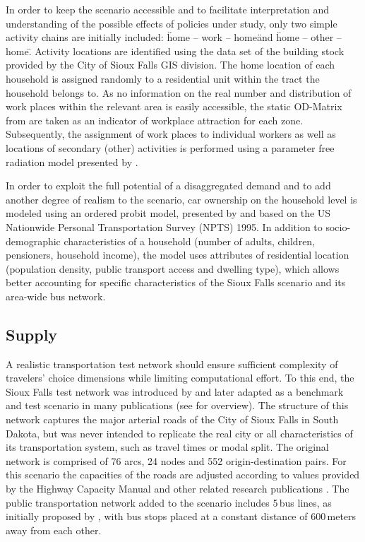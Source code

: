In order to keep the scenario accessible and to facilitate interpretation and understanding of the possible effects of policies under study, only two simple activity chains are initially included: \"home – work – home\" and \"home – other – home\". Activity locations are identified using the data set of the building stock provided by the City of Sioux Falls GIS division. The home location of each household is assigned randomly to a residential unit within the tract the household belongs to. As no information on the real number and distribution of work places within the relevant area is easily accessible, the static OD-Matrix from \citet[][]{LeBlancEtAl_TransRes_1975} are taken as an indicator of workplace attraction for each zone. Subsequently, the assignment of work places to individual workers as well as locations of secondary (other) activities is performed using a parameter free radiation model presented by \citet[][]{SiminiEtAl_NAT_2012}.

In order to exploit the full potential of a disaggregated demand and to add another degree of realism to the scenario, car ownership on the household level is modeled using an ordered probit model, presented by \citet[][]{GiulianoDargay_TransResA_2006} and based on the US Nationwide Personal Transportation Survey (NPTS) 1995. In addition to socio-demographic characteristics of a household (number of adults, children, pensioners, household income), the model uses attributes of residential location (population density, public transport access and dwelling type), which allows better accounting for specific characteristics of the Sioux Falls scenario and its area-wide bus network. 

\subsection{Supply} 
A realistic transportation test network should ensure sufficient complexity of travelers’ choice dimensions while limiting  computational effort. To this end, the Sioux Falls test network was introduced by \citet[][]{MorlokEtAl_ResRep_org-fhwa_1973} and later adapted as a benchmark and test scenario in many publications (see \citet[][]{ChakirovFourie_TechRep_FCL_2014} for overview). The structure of this network captures the major arterial roads of the City of Sioux Falls in South Dakota, but was never intended to replicate the real city or all characteristics of its transportation system, such as travel times or modal split. The original network is comprised of 76 arcs, 24 nodes and 552 origin-destination pairs. For this scenario the capacities of the roads are adjusted according to values provided by the Highway Capacity Manual \citet[][]{HCM_2010} and other related research publications \citep[e.g.,][]{NgCFSmall_Transportation_2012}. The public transportation network added to the scenario includes 5\,bus lines, as initially proposed by \citet[][]{AbdulaalLeBlanc_TransScience_1979}, with bus stops placed at a constant distance of 600\,meters away from each other. 

